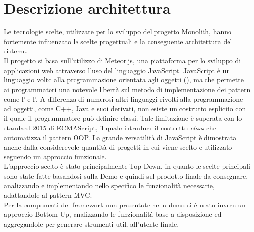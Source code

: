 \section{Descrizione architettura}
Le tecnologie scelte, utilizzate per lo sviluppo del progetto Monolith, hanno fortemente influenzato le scelte progettuali e la conseguente architettura del sistema.\\

Il progetto si basa sull’utilizzo di Meteor.js, una piattaforma per lo sviluppo di applicazioni web attraverso l’uso del linguaggio JavaScript. JavaScript è un linguaggio volto alla programmazione orientata agli oggetti (), ma che permette ai programmatori una notevole libertà sul metodo di implementazione dei pattern come l’ e l’. A differenza di numerosi altri linguaggi rivolti alla programmazione ad oggetti, come C++, Java e suoi derivati, non esiste un costrutto esplicito con il quale il programmatore può definire classi. Tale limitazione è superata con lo standard 2015 di ECMAScript, il quale introduce il costrutto \textit{class} che automatizza il pattern OOP. La grande versatilità di JavaScript è dimostrata anche dalla considerevole quantità di progetti in cui viene scelto e utilizzato seguendo un approccio funzionale.\\

L'approccio scelto è stato principalmente Top-Down, in quanto le scelte principali sono state fatte basandosi sulla Demo e quindi sul prodotto finale da consegnare, analizzando e implementando nello specifico le funzionalità necessarie, adattandole al pattern MVC.\\

Per la componenti del framework non presentate nella demo si è usato invece un approccio Bottom-Up, analizzando le funzionalità base a disposizione ed aggregandole per generare strumenti utili all’utente finale.